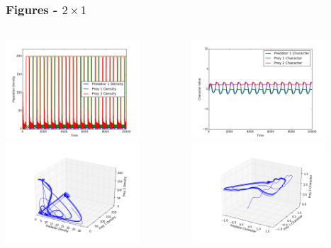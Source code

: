 \documentclass[10pt]{beamer}
\begin{document}
\begin{frame}
	\frametitle{Figures - $2\times1$}
	\begin{columns}[t]
		\begin{column}{.5\textwidth}
			\centering
			\includegraphics[width=5cm,height=3.75cm]{figures/1x2/variable_growth/densities_RQD.png}\\
			\includegraphics[width=5cm,height=3.75cm]{figures/1x2/variable_growth/density_phase_plane_RQD.png}
		\end{column}
		\begin{column}{.5\textwidth}
			\centering
			\includegraphics[width=5cm,height=3.75cm]{figures/1x2/variable_growth/traits_RQD.png}\\
			\includegraphics[width=5cm,height=3.75cm]{figures/1x2/variable_growth/trait_phase_plane_RQD.png}
		\end{column}
	\end{columns}
\end{frame}
\end{document}
